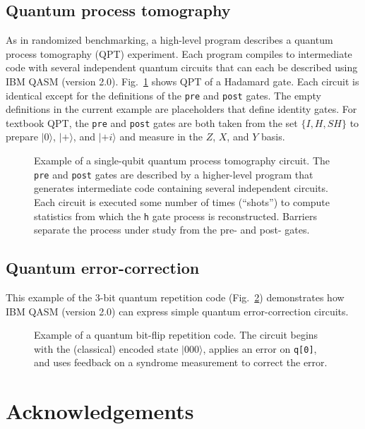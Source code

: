 \documentclass[USenglish,12pt,fleqn]{article} %
\newcommand*{\code}{\texttt}
\begin{document}
\subsection{Quantum process tomography}

As in randomized benchmarking, a high-level program describes a quantum process tomography (QPT) experiment. Each program compiles to intermediate code with several independent quantum circuits that can each be described using IBM QASM (version 2.0). Fig.~\ref{fig:example:qpt} shows QPT of a Hadamard gate. Each circuit is identical except for the definitions of the \code{pre} and \code{post} gates. The empty definitions in the current example are placeholders that define identity gates. For textbook QPT, the \code{pre} and \code{post} gates are both taken from the set $\{I,H,SH\}$ to prepare $|0\rangle$, $|+\rangle$, and $|+i\rangle$ and measure in the $Z$, $X$, and $Y$ basis.

\begin{figure}
\centering

\caption{Example of a single-qubit quantum process tomography circuit. The \code{pre} and \code{post} gates are described by a higher-level program that generates intermediate code containing several independent circuits. Each circuit is executed some number of times (``shots'') to compute statistics from which the \code{h} gate process is reconstructed. Barriers separate the process under study from the pre- and post- gates. \label{fig:example:qpt}}
\end{figure}

\subsection{Quantum error-correction}

This example of the 3-bit quantum repetition code (Fig.~\ref{fig:example:qec3}) demonstrates how IBM QASM (version 2.0) can express simple quantum error-correction circuits.

\begin{figure}
\centering

\caption{Example of a quantum bit-flip repetition code. The circuit begins with the (classical) encoded state $|000\rangle$, applies an error on \code{q[0]}, and uses feedback on a syndrome measurement to correct the error.
\label{fig:example:qec3}}
\end{figure}

\section{Acknowledgements}
\end{document}
